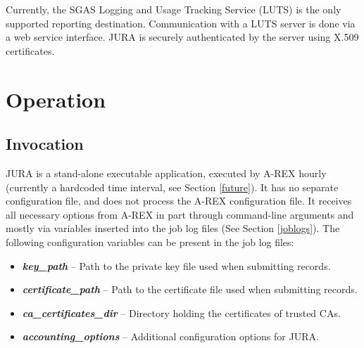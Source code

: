 \documentclass{article}                            %
\begin{document}
Currently, the SGAS Logging and Usage Tracking Service (LUTS) is the
only supported reporting destination. Communication with a LUTS server
is done via a web service interface. JURA is securely authenticated by
the server using X.509 certificates.



\section{Operation}

\subsection{Invocation}
\label{exec}
JURA is a stand-alone executable application, executed by A-REX hourly
(currently a hardcoded time interval, see Section \ref{future}). It
has no separate configuration file, and does not process the A-REX
configuration file. It receives all necessary options from A-REX in
part through command-line arguments and mostly via variables inserted
into the job log files (See Section \ref{joblogs}). The following
configuration variables can be present in the job log files:

\begin{itemize}
\item \textbf{\textit{key\_path}} -- Path to the private key file used when
  submitting records.
\item \textbf{\textit{certificate\_path}} -- Path to the certificate file used
  when submitting records.
\item \textbf{\textit{ca\_certificates\_dir}} -- Directory holding the
  certificates of trusted CAs.
\item \textbf{\textit{accounting\_options}} -- Additional configuration options
  for JURA.
\end{itemize}
\end{document}
